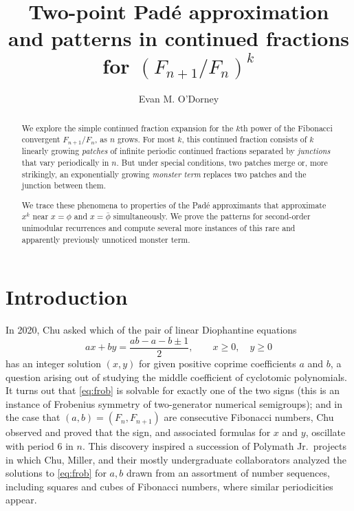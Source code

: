 \documentclass{article}
\title{Two-point Pad\'e approximation\\
and patterns in continued fractions for $(F_{n+1}/F_n)^k$
}
\author{Evan M. O'Dorney}
\numberwithin{equation}{section}
\theoremstyle{definition}
\theoremstyle{remark}
\newcommand{\<}{\left\langle}
\renewcommand{\>}{\right\rangle}
\begin{document}
\maketitle

\begin{abstract}
  We explore the simple continued fraction expansion for the $k$th power of the Fibonacci convergent $F_{n+1}/F_n$, as $n$ grows. For most $k$, this continued fraction consists of $k$ linearly growing \emph{patches} of infinite periodic continued fractions separated by \emph{junctions} that vary periodically in $n$. But under special conditions, two patches merge or, more strikingly, an exponentially growing \emph{monster term} replaces two patches and the junction between them.

  We trace these phenomena to properties of the Pad\'e approximants that approximate $x^k$ near $x = \phi$ and $x = \bar\phi$ simultaneously. We prove the patterns for second-order unimodular recurrences and compute several more instances of this rare and apparently previously unnoticed monster term.
\end{abstract}

\section{Introduction}
In 2020, Chu \cite{Chu2020} asked which of the pair of linear Diophantine equations
\begin{equation} \label{eq:frob}
  a x + b y = \frac{a b - a - b \pm 1}{2}, \qquad x \geq 0, \quad y \geq 0
\end{equation}
has an integer solution $(x,y)$ for given positive coprime coefficients $a$ and $b$, a question arising out of studying the middle coefficient of cyclotomic polynomials. It turns out that \eqref{eq:frob} is solvable for exactly one of the two signs (this is an instance of Frobenius symmetry of two-generator numerical semigroups); and in the case that $(a,b) = (F_n, F_{n+1})$ are consecutive Fibonacci numbers, Chu observed and proved that the sign, and associated formulas for $x$ and $y$, oscillate with period $6$ in $n$. This discovery inspired a succession of Polymath Jr.\ projects \cite{ChenEtAl2025,ArachchiEtAl2026,ChuGulecha2026} in which Chu, Miller, and their mostly undergraduate collaborators analyzed the solutions to \eqref{eq:frob} for $a, b$ drawn from an assortment of number sequences, including squares and cubes of Fibonacci numbers, where similar periodicities appear.
\end{document}
